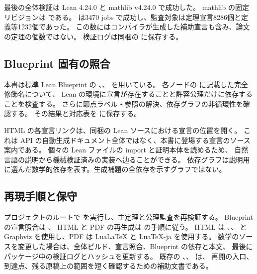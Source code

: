 最後の全体検証は Lean 4.24.0 と mathlib v4.24.0 で成功した。
mathlib の固定リビジョンは
 である。
 は3470 jobs で成功し、監査対象は定理宣言8286個と定義等1232個であった。
この数にはコンパイラが生成した補助宣言も含み、論文の定理の個数ではない。
検証ログは同梱の  に保存する。

\subsection{Blueprint 固有の照合}
本書は標準 Lean Blueprint の 、、
 を用いている。
各ノードの  に記載した完全修飾名について、
Lean の環境に宣言が存在することと許容公理だけに依存することを検査する。
さらに節点ラベル・参照の解決、依存グラフの非循環性を確認する。
その結果と対応表を  に保存する。

HTML の各宣言リンクは、同梱の Lean ソースにおける宣言の位置を開く。
これは API の自動生成ドキュメント全体ではなく、本書に登場する宣言のソース案内である。
個々の Lean ファイルの import と証明本体を読めるため、
自然言語の説明から機械検証済みの実装へ辿ることができる。
依存グラフは説明用に選んだ数学的依存を表す。生成補題の全依存を示すグラフではない。

\subsection{再現手順と保守}
プロジェクトのルートで  を実行し、主定理と公理監査を再検証する。
Blueprint の宣言照合は 、
HTML と PDF の再生成は  の手順に従う。
HTML は 、、
 と Graphviz を使用し、PDF は LuaLaTeX と LuaTeX-ja を使用する。
数学のソースを変更した場合は、全体ビルド、宣言照合、Blueprint の依存と本文、
最後にパッケージ中の検証ログとハッシュを更新する。
既存の 、、 は、
再開の入口、到達点、残る原稿上の範囲を短く確認するための補助文書である。
